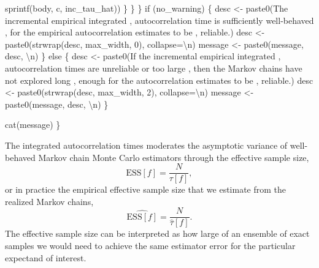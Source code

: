 \documentclass[
  letterpaper,
  DIV=11,
  numbers=noendperiod]{scrartcl}
\newenvironment{Shaded}{\begin{snugshade}}{\end{snugshade}}
\newcommand{\CharTok}[1]{\textcolor[rgb]{0.13,0.47,0.30}{#1}}
\newcommand{\ControlFlowTok}[1]{\textcolor[rgb]{0.00,0.23,0.31}{#1}}
\newcommand{\DecValTok}[1]{\textcolor[rgb]{0.68,0.00,0.00}{#1}}
\newcommand{\NormalTok}[1]{\textcolor[rgb]{0.00,0.23,0.31}{#1}}
\newcommand{\OperatorTok}[1]{\textcolor[rgb]{0.37,0.37,0.37}{#1}}
\newcommand{\StringTok}[1]{\textcolor[rgb]{0.13,0.47,0.30}{#1}}
\begin{document}
\begin{Shaded}
\begin{Highlighting}[]
\NormalTok{                                sprintf(body, c, inc\_tau\_hat))}
\NormalTok{      \}}
\NormalTok{    \}}
\NormalTok{  \}}
  \ControlFlowTok{if}\NormalTok{ (no\_warning) \{}
\NormalTok{    desc }\OperatorTok{\textless{}{-}}\NormalTok{ paste0(}\StringTok{\textquotesingle{}The incremental empirical integrated \textquotesingle{}}\NormalTok{,}
                   \StringTok{\textquotesingle{}autocorrelation time is sufficiently well{-}behaved \textquotesingle{}}\NormalTok{,}
                   \StringTok{\textquotesingle{}for the empirical autocorrelation estimates to be \textquotesingle{}}\NormalTok{,}
                   \StringTok{\textquotesingle{}reliable.\textquotesingle{}}\NormalTok{)}
\NormalTok{    desc }\OperatorTok{\textless{}{-}}\NormalTok{ paste0(strwrap(desc, max\_width, }\DecValTok{0}\NormalTok{), collapse}\OperatorTok{=}\StringTok{\textquotesingle{}}\CharTok{\textbackslash{}n}\StringTok{\textquotesingle{}}\NormalTok{)}
\NormalTok{    message }\OperatorTok{\textless{}{-}}\NormalTok{ paste0(message, desc, }\StringTok{\textquotesingle{}}\CharTok{\textbackslash{}n}\StringTok{\textquotesingle{}}\NormalTok{)}
\NormalTok{  \} }\ControlFlowTok{else}\NormalTok{ \{}
\NormalTok{    desc }\OperatorTok{\textless{}{-}}\NormalTok{ paste0(}\StringTok{\textquotesingle{}If the incremental empirical integrated \textquotesingle{}}\NormalTok{,}
                   \StringTok{\textquotesingle{}autocorrelation times are unreliable or too large \textquotesingle{}}\NormalTok{,}
                   \StringTok{\textquotesingle{}then the Markov chains have not explored long \textquotesingle{}}\NormalTok{,}
                   \StringTok{\textquotesingle{}enough for the autocorrelation estimates to be \textquotesingle{}}\NormalTok{,}
                   \StringTok{\textquotesingle{}reliable.\textquotesingle{}}\NormalTok{)}
\NormalTok{    desc }\OperatorTok{\textless{}{-}}\NormalTok{ paste0(strwrap(desc, max\_width, }\DecValTok{2}\NormalTok{), collapse}\OperatorTok{=}\StringTok{\textquotesingle{}}\CharTok{\textbackslash{}n}\StringTok{\textquotesingle{}}\NormalTok{)}
\NormalTok{    message }\OperatorTok{\textless{}{-}}\NormalTok{ paste0(message, desc, }\StringTok{\textquotesingle{}}\CharTok{\textbackslash{}n}\StringTok{\textquotesingle{}}\NormalTok{)}
\NormalTok{  \}}

\NormalTok{  cat(message)}
\NormalTok{\}}
\end{Highlighting}
\end{Shaded}

The integrated autocorrelation times moderates the asymptotic variance
of well-behaved Markov chain Monte Carlo estimators through the
effective sample size, \[
\text{ESS}[f] = \frac{N}{\tau[f]},
\] or in practice the empirical effective sample size that we estimate
from the realized Markov chains, \[
\hat{\text{ESS}[f]} = \frac{N}{\hat{\tau}[f]}.
\] The effective sample size can be interpreted as how large of an
ensemble of exact samples we would need to achieve the same estimator
error for the particular expectand of interest.
\end{document}
